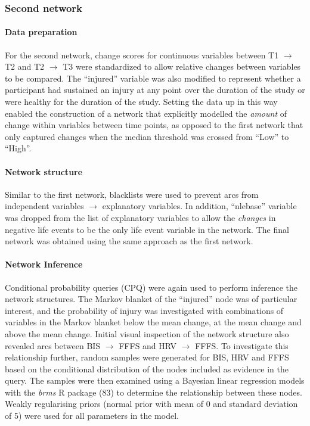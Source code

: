 \documentclass[
  english,
  man]{apa6}
\let\oldparagraph\paragraph
\renewcommand{\paragraph}[1]{\oldparagraph{#1}\mbox{}}
\begin{document}
\hypertarget{second-network}{%
\subsubsection{Second network}\label{second-network}}

\hypertarget{data-preparation-1}{%
\paragraph{Data preparation}\label{data-preparation-1}}

For the second network, change scores for continuous variables between T1 \(\rightarrow\) T2 and T2 \(\rightarrow\) T3 were standardized to allow relative changes between variables to be compared.
The ``injured'' variable was also modified to represent whether a participant had sustained an injury at any point over the duration of the study or were healthy for the duration of the study.
Setting the data up in this way enabled the construction of a network that explicitly modelled the \emph{amount} of change within variables between time points, as opposed to the first network that only captured changes when the median threshold was crossed from ``Low'' to ``High''.

\hypertarget{network-structure-1}{%
\paragraph{Network structure}\label{network-structure-1}}

Similar to the first network, blacklists were used to prevent arcs from independent variables \(\rightarrow\) explanatory variables.
In addition, ``nlebase'' variable was dropped from the list of explanatory variables to allow the \emph{changes} in negative life events to be the only life event variable in the network.
The final network was obtained using the same approach as the first network.

\hypertarget{network-inference-1}{%
\paragraph{Network Inference}\label{network-inference-1}}

Conditional probability queries (CPQ) were again used to perform inference the network structures.
The Markov blanket of the ``injured'' node was of particular interest, and the probability of injury was investigated with combinations of variables in the Markov blanket below the mean change, at the mean change and above the mean change.
Initial visual inspection of the network structure also revealed arcs between BIS \(\rightarrow\) FFFS and HRV \(\rightarrow\) FFFS.
To investigate this relationship further, random samples were generated for BIS, HRV and FFFS based on the conditional distribution of the nodes included as evidence in the query.
The samples were then examined using a Bayesian linear regression models with the \emph{brms} R package (83) to determine the relationship between these nodes.
Weakly regularising priors (normal prior with mean of 0 and standard deviation of 5) were used for all parameters in the model.
\end{document}
